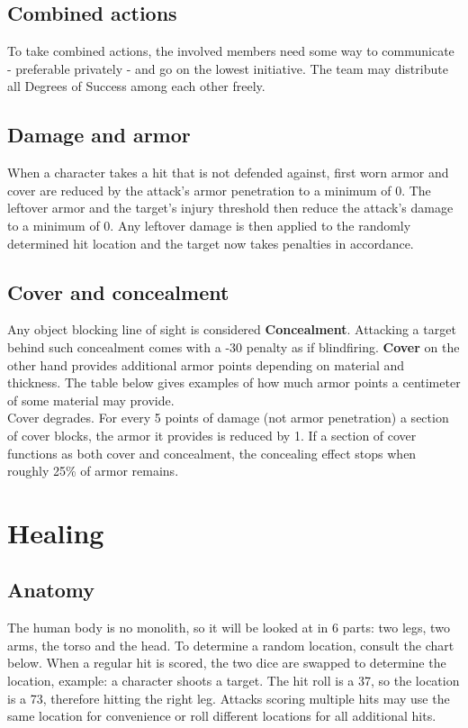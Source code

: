 \documentclass[12pt,a4paper,openany]{book}
\begin{document}
	\section{Combined actions}
	To take combined actions, the involved members need some way to communicate - preferable privately - and go on the lowest initiative. The team may distribute all Degrees of Success among each other freely.
	\section{Damage and armor}
	When a character takes a hit that is not defended against, first worn armor and cover are reduced by the attack's armor penetration to a minimum of 0. The leftover armor and the target’s injury threshold then reduce the attack’s damage to a minimum of 0. Any leftover damage is then applied to the randomly determined hit location and the target now takes penalties in accordance.
	\section{Cover and concealment}
	Any object blocking line of sight is considered \textbf{Concealment}. Attacking a target behind such concealment comes with a -30 penalty as if blindfiring.
	\textbf{Cover} on the other hand provides additional armor points depending on material and thickness. The table below gives examples of how much armor points a centimeter of some material may provide.\\
	Cover degrades. For every 5 points of damage (not armor penetration) a section of cover blocks, the armor it provides is reduced by 1. If a section of cover functions as both cover and concealment, the concealing effect stops when roughly 25\% of armor remains.
	
	\chapter{Healing}
	\section{Anatomy}
	The human body is no monolith, so it will be looked at in 6 parts: two legs, two arms, the torso and the head. To determine a random location, consult the chart below. When a regular hit is scored, the two dice are swapped to determine the location, example: a character shoots a target. The hit roll is a 37, so the location is a 73, therefore hitting the right leg. Attacks scoring multiple hits may use the same location for convenience or roll different locations for all additional hits.
\end{document}

